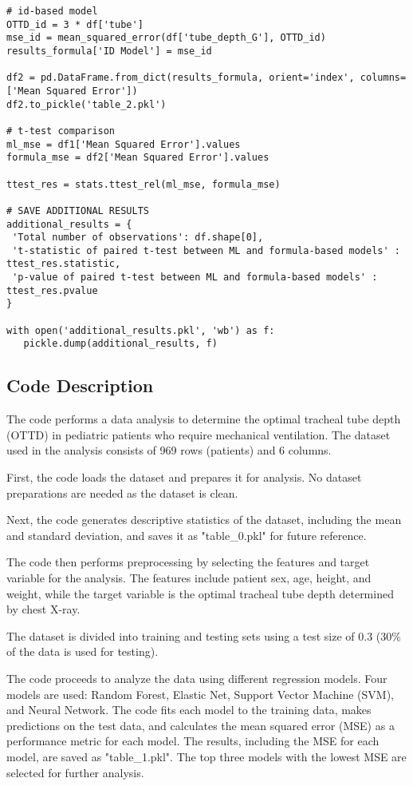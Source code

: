 \documentclass[11pt]{article}
\begin{document}
\begin{verbatim}
# id-based model
OTTD_id = 3 * df['tube']
mse_id = mean_squared_error(df['tube_depth_G'], OTTD_id)
results_formula['ID Model'] = mse_id

df2 = pd.DataFrame.from_dict(results_formula, orient='index', columns=['Mean Squared Error'])
df2.to_pickle('table_2.pkl')

# t-test comparison
ml_mse = df1['Mean Squared Error'].values
formula_mse = df2['Mean Squared Error'].values

ttest_res = stats.ttest_rel(ml_mse, formula_mse)

# SAVE ADDITIONAL RESULTS
additional_results = {
 'Total number of observations': df.shape[0],
 't-statistic of paired t-test between ML and formula-based models' : ttest_res.statistic,
 'p-value of paired t-test between ML and formula-based models' : ttest_res.pvalue
}

with open('additional_results.pkl', 'wb') as f:
   pickle.dump(additional_results, f)

\end{verbatim}

\subsection{Code Description}

The code performs a data analysis to determine the optimal tracheal tube depth (OTTD) in pediatric patients who require mechanical ventilation. The dataset used in the analysis consists of 969 rows (patients) and 6 columns. 

First, the code loads the dataset and prepares it for analysis. No dataset preparations are needed as the dataset is clean.

Next, the code generates descriptive statistics of the dataset, including the mean and standard deviation, and saves it as "table\_0.pkl" for future reference.

The code then performs preprocessing by selecting the features and target variable for the analysis. The features include patient sex, age, height, and weight, while the target variable is the optimal tracheal tube depth determined by chest X-ray.

The dataset is divided into training and testing sets using a test size of 0.3 (30\% of the data is used for testing). 

The code proceeds to analyze the data using different regression models. Four models are used: Random Forest, Elastic Net, Support Vector Machine (SVM), and Neural Network. The code fits each model to the training data, makes predictions on the test data, and calculates the mean squared error (MSE) as a performance metric for each model. The results, including the MSE for each model, are saved as "table\_1.pkl". The top three models with the lowest MSE are selected for further analysis.
\end{document}
